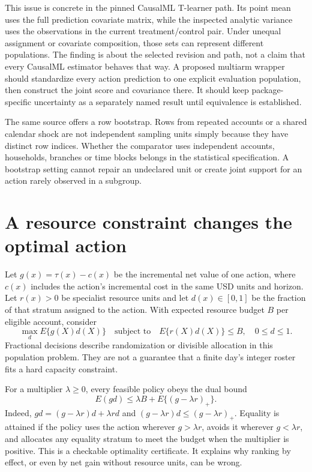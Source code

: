 This issue is concrete in the pinned CausalML T-learner path. Its point mean
uses the full prediction covariate matrix, while the inspected analytic
variance uses the observations in the current treatment/control pair. Under
unequal assignment or covariate composition, those sets can represent
different populations. The finding is about the selected revision and path,
not a claim that every CausalML estimator behaves that way. A proposed
multiarm wrapper should standardize every action prediction to one explicit
evaluation population, then construct the joint score and covariance there.
It should keep package-specific uncertainty as a separately named result
until equivalence is established.\citep{exec14_causalml_primary,exec17_s4_paths}

The same source offers a row bootstrap. Rows from repeated accounts or a
shared calendar shock are not independent sampling units simply because they
have distinct row indices. Whether the comparator uses independent accounts,
households, branches or time blocks belongs in the statistical specification.
A bootstrap setting cannot repair an undeclared unit or create joint support
for an action rarely observed in a subgroup.

\section{A resource constraint changes the optimal action}
\label{exec17:s4-allocation}

Let $g(x)=\tau(x)-c(x)$ be the incremental net value of one action, where
$c(x)$ includes the action's incremental cost in the same USD units and
horizon. Let $r(x)>0$ be specialist resource units and let $d(x)\in[0,1]$
be the fraction of that stratum assigned to the action. With expected
resource budget $B$ per eligible account, consider
\begin{equation}
 \max_d E\{g(X)d(X)\}\quad\text{subject to}\quad
 E\{r(X)d(X)\}\leq B,\quad 0\leq d\leq1.
 \label{exec17:s4-resource-problem}
\end{equation}
Fractional decisions describe randomization or divisible allocation in this
population problem. They are not a guarantee that a finite day's integer
roster fits a hard capacity constraint.

For a multiplier $\lambda\geq0$, every feasible policy obeys the dual bound
\begin{equation}
 E(gd)\leq \lambda B+E\{(g-\lambda r)_+\}.
 \label{exec17:s4-resource-dual}
\end{equation}
Indeed, $gd=(g-\lambda r)d+\lambda rd$ and
$(g-\lambda r)d\leq(g-\lambda r)_+$. Equality is attained if the policy
uses the action wherever $g>\lambda r$, avoids it wherever $g<\lambda r$,
and allocates any equality stratum to meet the budget when the multiplier is
positive. This is a checkable optimality certificate. It explains why ranking
by effect, or even by net gain without resource units, can be wrong.

